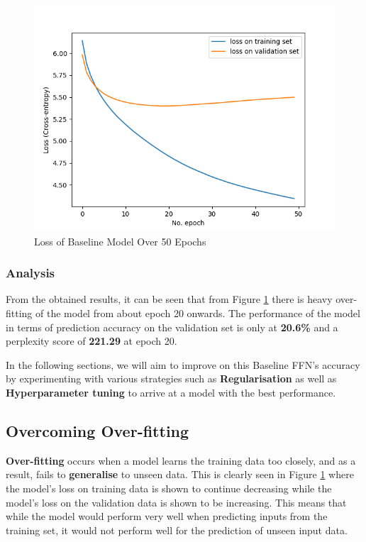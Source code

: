 \documentclass[sigconf,nonacm=true]{acmart}
\begin{document}
\begin{figure}[H]
	\centering
	\includegraphics[scale=0.47]{figures/baseline_adam_loss.png}
	\caption{Loss of Baseline Model Over 50 Epochs}
	\label{fig:baseloss}
\end{figure}

\subsubsection{Analysis}
From the obtained results, it can be seen that from Figure \ref{fig:baseloss} there is heavy over-fitting of the model from about 
epoch 20 onwards. The performance of the model in terms of prediction 
accuracy on the validation set is only at \textbf{20.6\%} and a perplexity score of \textbf{221.29} at epoch 20.

In the following sections, we will aim to improve on this Baseline FFN's accuracy
by experimenting with various strategies such as
\textbf{Regularisation} as well as \textbf{Hyperparameter tuning} to arrive at a
model with the best performance.

\subsection{Overcoming Over-fitting}
\textbf{Over-fitting} occurs when a model learns the training data too closely, and as a result, fails to \textbf{generalise} to unseen data. This is clearly seen in Figure \ref{fig:baseloss} where the model's loss on training data is shown to continue decreasing while the model's loss on the validation data is shown to be increasing. This means that while the model would perform very well when predicting inputs from the training set, it would not perform well for the prediction of unseen input data.
\end{document}
